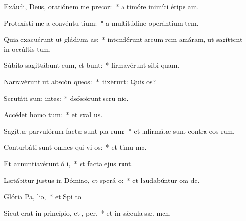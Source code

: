 \item Exáudi, Deus, oratiónem me  precor:~* a timóre inimíci éripe  am.
\item Protexísti me a convéntu tium:~* a multitúdine operántium tem.
\item Quia exacuérunt ut gládium  as:~* intendérunt arcum rem amáram, ut sagíttent in occúltis tum.
\item Súbito sagittábunt eum, et  bunt:~* firmavérunt sibi  quam.
\item Narravérunt ut abscón queos:~* dixérunt: Quis  os?
\item Scrutáti sunt intes:~* defecérunt scru nio.
\item Accédet homo   tum:~* et exal us.
\item Sagíttæ parvulórum factæ sunt pla rum:~* et infirmátæ sunt contra eos  rum.
\item Conturbáti sunt omnes qui vi os:~* et tímu  mo.
\item Et annuntiavérunt ó i,~* et facta ejus runt.
\item Lætábitur justus in Dómino, et sperá  o:~* et laudabúntur om  de.
\item Glória Pa,  lio,~* et Spi to.
\item Sicut erat in princípio, et ,  per,~* et in sǽcula sæ. men.
